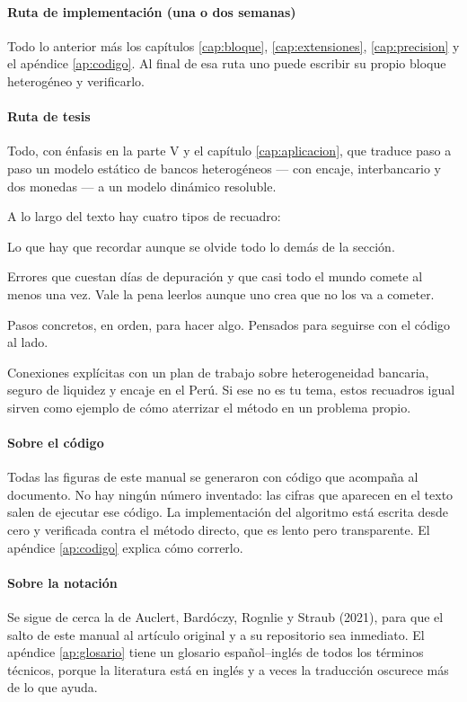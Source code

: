 \paragraph{Ruta de implementación (una o dos semanas)} Todo lo anterior más los
capítulos \ref{cap:bloque}, \ref{cap:extensiones}, \ref{cap:precision} y el
apéndice \ref{ap:codigo}. Al final de esa ruta uno puede escribir su propio
bloque heterogéneo y verificarlo.

\paragraph{Ruta de tesis} Todo, con énfasis en la parte V y el capítulo
\ref{cap:aplicacion}, que traduce paso a paso un modelo estático de bancos
heterogéneos --- con encaje, interbancario y dos monedas --- a un modelo
dinámico resoluble.

\vspace{1em}
A lo largo del texto hay cuatro tipos de recuadro:

\begin{idea}
Lo que hay que recordar aunque se olvide todo lo demás de la sección.
\end{idea}

\begin{trampa}
Errores que cuestan días de depuración y que casi todo el mundo comete al menos
una vez. Vale la pena leerlos aunque uno crea que no los va a cometer.
\end{trampa}

\begin{receta}
Pasos concretos, en orden, para hacer algo. Pensados para seguirse con el
código al lado.
\end{receta}

\begin{tutesis}
Conexiones explícitas con un plan de trabajo sobre heterogeneidad bancaria,
seguro de liquidez y encaje en el Perú. Si ese no es tu tema, estos recuadros
igual sirven como ejemplo de cómo aterrizar el método en un problema propio.
\end{tutesis}

\vspace{1em}
\paragraph{Sobre el código} Todas las figuras de este manual se generaron con
código que acompaña al documento. No hay ningún número inventado: las cifras que
aparecen en el texto salen de ejecutar ese código. La implementación del
algoritmo está escrita desde cero y verificada contra el método directo, que es
lento pero transparente. El apéndice \ref{ap:codigo} explica cómo correrlo.

\paragraph{Sobre la notación} Se sigue de cerca la de
Auclert, Bardóczy, Rognlie y Straub (2021), para que el salto de este manual al artículo original y a su
repositorio sea inmediato. El apéndice \ref{ap:glosario} tiene un glosario
español--inglés de todos los términos técnicos, porque la literatura está en
inglés y a veces la traducción oscurece más de lo que ayuda.
\clearpage

